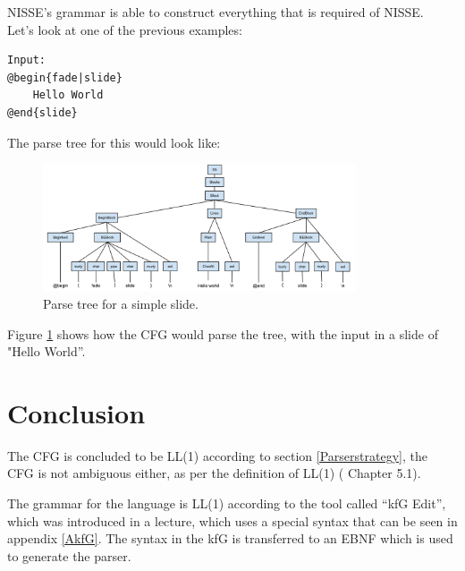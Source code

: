 NISSE's grammar is able to construct everything that is required of NISSE. \\
Let's look at one of the previous examples:

\begin{lstlisting}[frame=single]
Input:
@begin{fade|slide}
    Hello World
@end{slide}
\end{lstlisting}

The parse tree for this would look like: 

\begin{figure}[! h]
\centering
	 \includegraphics[width=350px]{images/ebnfexample.png}
		 \caption{Parse tree for a simple slide.}	
	\label{fig:Parsetree}
\end{figure}
Figure \ref{fig:Parsetree} shows how the CFG would parse the tree, with the input in a slide of "Hello World''. 

\section{Conclusion}
The CFG is concluded to be LL(1) according to section \ref{Parserstrategy}, the CFG is not ambiguous either, as per the definition of LL(1) (\cite{CaC} Chapter 5.1).

The grammar for the language is LL(1) according to the tool called ``kfG Edit'', which was introduced in a lecture, which uses a special syntax that can be seen in appendix \ref{AkfG}. The syntax in the kfG is transferred to an EBNF which is used to generate the parser.